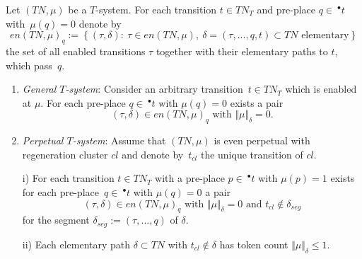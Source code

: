 \documentclass{fundam}
\begin{document}
\begin{proposition}\label{prop_perpetualtsystem}
Let $(TN,\mu)$ be a $T$-system. For each transition $t\in TN_T$ and pre-place $q \in\ ^\bullet t$ \mbox{with $\mu(q)=0$} denote by
$$en(TN,\mu)_q:=\left\{(\tau,\delta):\ \tau \in en(TN,\mu),\ \delta=(\tau,...,q,t) \subset TN \text{ elementary}\right\}$$
the set of all enabled transitions $\tau$ together with their elementary paths to $t$, which \mbox{pass $q$}.
\begin{enumerate}
\item \emph{General $T$-system}: Consider an arbitrary \mbox{transition $t\in TN_T$} which is enabled at $\mu$. For each pre-place $q \in\ ^\bullet t \text{ with } \mu(q)=0$ exists a pair
$$(\tau,\delta) \in en(TN,\mu)_q \text{ with } \Vert \mu \Vert_\delta =0.$$
\item \emph{Perpetual $T$-system}: Assume that $(TN,\mu)$ is even perpetual with regeneration cluster $cl$ and denote \mbox{by $t_{cl}$} the unique transition of $cl$.
\begin{flushleft}
i) For each transition $t\in TN_T$ with a pre-place $p\in \ ^\bullet t$ with $\mu(p)=1$ exists for each \mbox{pre-place $q \in\ ^\bullet t$} with $\mu(q)=0$ a pair
$$(\tau,\delta) \in en(TN,\mu)_q \text{ with } \Vert \mu \Vert_\delta =0 \text{ and } t_{cl} \notin \delta_{seg}$$
for the segment $\delta_{seg}:=(\tau,...,q)$ of $\delta$.

ii) Each elementary path $\delta \subset TN$ with $t_{cl} \notin \delta$ has token count $\Vert \mu \Vert_\delta \leq 1$.
\end{flushleft}
\end{enumerate}
\end{proposition}
\end{document}
